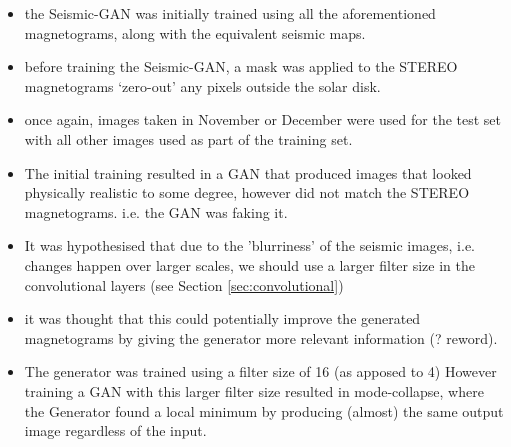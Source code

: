 \documentclass[11pt,a4paper,onecolumn]{report}
\begin{document}
\begin{itemize}
  \item the Seismic-GAN was initially trained using all the aforementioned
  magnetograms, along with the equivalent seismic maps.
  \item before training the Seismic-GAN, a mask was applied to the STEREO
  magnetograms `zero-out' any pixels outside the solar disk.
  \item once again, images taken in November or December were used for the test
  set with all other images used as part of the training set.
  
  \item The initial training resulted in a GAN that produced images that looked
  physically realistic to some degree, however did not match the STEREO
  magnetograms. i.e. the GAN was faking it.

  \item It was hypothesised that due to the 'blurriness' of the seismic images,
  i.e. changes happen over larger scales, we should use a larger filter size in
  the convolutional layers (see Section \ref{sec:convolutional})
  \item it was thought that this could potentially improve the generated
  magnetograms by giving the generator more relevant information (? reword).

  \item The generator was trained using a filter size of 16 (as apposed to 4)
  However training a GAN with this larger filter size resulted in
  mode-collapse, where the Generator found a local minimum by producing (almost)
  the same output image regardless of the input.
\end{itemize}
\end{document}
